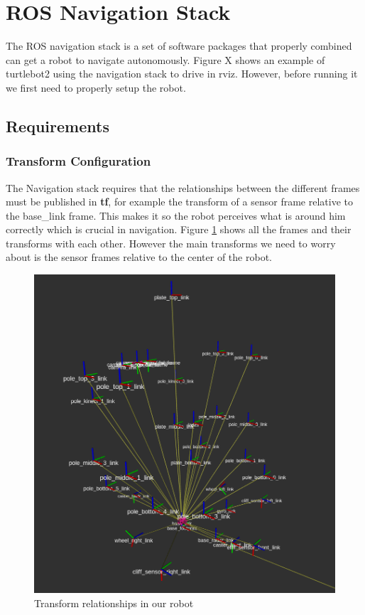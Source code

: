\documentclass[12pt]{article}
\begin{document}
\section{ROS Navigation Stack}

The ROS navigation stack is a set of software packages that properly combined can get a robot to navigate autonomously.
Figure X  shows an example of turtlebot2 using the navigation stack to drive in rviz.
However, before running it we first need to properly setup the robot.
\subsection{Requirements}
\subsubsection{Transform Configuration}
The Navigation stack requires that the relationships between the different frames must be published in \textbf{tf}, for example the transform of a sensor frame relative to the  base\_link frame. This makes it so the robot perceives what is around him correctly which is crucial in navigation.
Figure \ref{fig:tf} shows all the frames and their transforms with each other. However the main transforms we need to worry about is the sensor frames relative to the center of the robot.
\begin{figure}[!htb]
    \centering
    \includegraphics[scale=0.25]{tf.png}
    \caption{Transform relationships in our robot}
    \label{fig:tf}
\end{figure}
\end{document}
